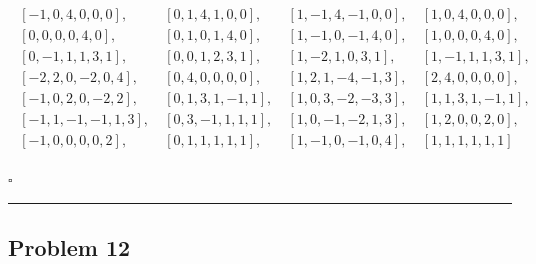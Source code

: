 \documentclass[12pt]{article}
\newcommand*{\QEDB}{\hfill\ensuremath{\square}}
\newcommand{\CBrackets}[1]{\left\{#1\right\}}
\newcommand{\ParTh}[1]{\left(#1\right)}
\newcommand{\BF}[1]{{\bf#1}}
\newcommand{\horrule}[1]{\rule{\linewidth}{#1}}
\begin{document}
\begin{align}
\begin{array}{llll}
\left[-1,  0,  4,  0,  0,  0\right],~&\left[ 0,  1,  4,  1,  0,  0\right],~&\left[ 1, -1,  4, -1,  0,  0\right],~&\left[ 1,  0,  4,  0,  0,  0\right],\\
\left[ 0,  0,  0,  0,  4,  0\right],~&\left[ 0,  1,  0,  1,  4,  0\right],~&\left[ 1, -1,  0, -1,  4,  0\right],~&\left[ 1,  0,  0,  0,  4,  0\right],\\
\left[ 0, -1,  1,  1,  3,  1\right],~&\left[ 0,  0,  1,  2,  3,  1\right],~&\left[ 1, -2,  1,  0,  3,  1\right],~&\left[ 1, -1,  1,  1,  3,  1\right],\\
\left[-2,  2,  0, -2,  0,  4\right],~&\left[ 0,  4,  0,  0,  0,  0\right],~&\left[ 1,  2,  1, -4, -1,  3\right],~&\left[ 2,  4,  0,  0,  0,  0\right],\\
\left[-1,  0,  2,  0, -2,  2\right],~&\left[ 0,  1,  3,  1, -1,  1\right],~&\left[ 1,  0,  3, -2, -3,  3\right],~&\left[ 1,  1,  3,  1, -1,  1\right],\\
\left[-1,  1, -1, -1,  1,  3\right],~&\left[ 0,  3, -1,  1,  1,  1\right],~&\left[ 1,  0, -1, -2,  1,  3\right],~&\left[ 1,  2,  0,  0,  2,  0\right],\\
\left[-1,  0,  0,  0,  0,  2\right],~&\left[ 0,  1,  1,  1,  1,  1\right],~&\left[ 1, -1,  0, -1,  0,  4\right],~&\left[ 1,  1,  1,  1,  1,  1\right]
\end{array}
\end{align}

\QEDB

\horrule{0.5pt}

\subsection*{Problem 12}
\end{document}
